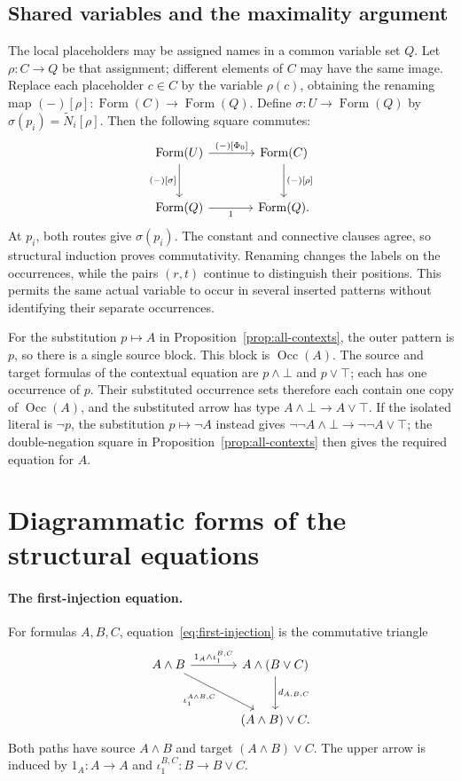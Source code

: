 \documentclass[11pt]{article}
\newcommand{\Occ}{\operatorname{Occ}}
\newcommand{\FormulaSet}{\operatorname{Form}}
\begin{document}
\subsection{Shared variables and the maximality argument}\label{app:shared}

The local placeholders may be assigned names in a common variable
set $Q$. Let $\rho:C\to Q$ be that assignment; different elements
of $C$ may have the same image. Replace each placeholder $c\in C$
by the variable $\rho(c)$, obtaining the renaming map
$(-)[\rho]:\FormulaSet(C)\to\FormulaSet(Q)$. Define
$\sigma:U\to\FormulaSet(Q)$ by
$\sigma(p_i)=\widetilde N_i[\rho]$.
Then the following square commutes:
\begin{equation}\label{eq:app-renaming}
\begin{tikzcd}[column sep=large,row sep=large]
 \FormulaSet(U)\arrow[r,"{(-)[\Phi_0]}"]
    \arrow[d,"{(-)[\sigma]}"']
   &\FormulaSet(C)\arrow[d,"{(-)[\rho]}"]\\
 \FormulaSet(Q)\arrow[r,"1"']&\FormulaSet(Q).
\end{tikzcd}
\end{equation}
At $p_i$, both routes give $\sigma(p_i)$. The constant and connective
clauses agree, so structural induction proves commutativity.
Renaming changes the labels on the occurrences, while the pairs
$(r,t)$ continue to distinguish their positions. This permits the
same actual variable to occur in several inserted patterns without
identifying their separate occurrences.

For the substitution $p\mapsto A$ in
Proposition~\ref{prop:all-contexts}, the outer pattern is $p$,
so there is a single source block. This block is $\Occ(A)$.
The source and target formulas of the contextual equation are
$p\wedge\bot$ and $p\vee\top$; each has one occurrence of $p$. Their substituted occurrence sets therefore each
contain one copy of $\Occ(A)$, and the substituted arrow has type
$A\wedge\bot\to A\vee\top$. If the isolated literal is $\neg p$,
the substitution $p\mapsto\neg A$ instead gives
$\neg\neg A\wedge\bot\to\neg\neg A\vee\top$; the
double-negation square in Proposition~\ref{prop:all-contexts}
then gives the required equation for $A$.

\section{Diagrammatic forms of the structural equations}
\label{app:structural-diagrams}

\paragraph{The first-injection equation.}
For formulas $A,B,C$, equation~\eqref{eq:first-injection} is the
commutative triangle
\[
\begin{tikzcd}[column sep=large,row sep=large]
 A\wedge B
   \arrow[r,"1_A\wedge\iota_1^{B,C}"]
   \arrow[dr,"{\iota_1^{A\wedge B,C}}"']
   &A\wedge(B\vee C)\arrow[d,"d_{A,B,C}"]\\
   &(A\wedge B)\vee C.
\end{tikzcd}
\]
Both paths have source $A\wedge B$ and target $(A\wedge B)\vee C$.
The upper arrow is induced by $1_A:A\to A$ and
$\iota_1^{B,C}:B\to B\vee C$.
\end{document}
